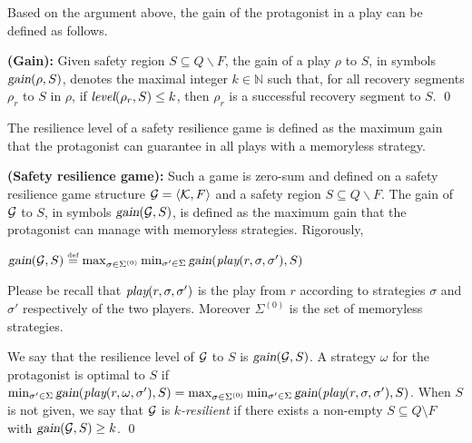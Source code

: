 Based on the argument above, 
the gain of the protagonist in a play can be defined as follows. 

\begin{definition}
\label{def.gain} {\bf (Gain):} 
Given safety region $S \subseteq Q\smallsetminus F$, 
the gain of a play $\rho$ to $S$, in symbols $\textsl{gain}(\rho,S)$, 
denotes the maximal integer $k \in \mathbb N$ such that, 
for all recovery segments $\rho_r$ to $S$ in $\rho$, 
if $\mbox{\em level}(\rho_r,S)\leq k$, 
then $\rho_r$ is a successful recovery segment to $S$. 
\qed 
\end{definition}

The resilience level of a safety resilience game is defined 
as the maximum gain that the protagonist can guarantee in all plays 
with a memoryless strategy.  


%  

\begin{definition}\label{def.srgame}  
{\bf (Safety resilience game):} 
Such a game is zero-sum and defined on 
a safety resilience game structure ${\cal G}=\langle {\cal K},F\rangle$ 
and a safety region $S\subseteq Q\smallsetminus F$. 
The gain of ${\cal G}$ to $S$, in symbols $\textsl{gain}({\cal G},S)$, is defined as 
the maximum gain that the protagonist can manage with memoryless strategies.  
Rigorously, 
\begin{center} 
$\textsl{gain}({\cal G},S)\stackrel{\mbox{\tiny def}}{=} \max_{\sigma\in \Sigma^{(0)}}\min_{\sigma'\in \Sigma}
\textsl{gain}(\mbox{\em play}(r,\sigma,\sigma'),S)$
\end{center} 
\label{reply1.emplay} 
Please be recall that $\mbox{\em play}(r,\sigma,\sigma')$ is the play from $r$ 
according to strategies $\sigma$ and $\sigma'$ respectively of the 
two players. 
Moreover $\Sigma^{(0)}$ is the set of memoryless strategies. 

We say that the resilience level of ${\cal G}$ to $S$ is $\textsl{gain}({\cal G},S)$. 
\label{reply2.optimal}
A strategy $\omega$ for the protagonist is optimal to $S$ if 
$\min_{\sigma'\in \Sigma}
\textsl{gain}(\mbox{\em play}(r,\omega,\sigma'),S)=\max_{\sigma\in \Sigma^{(0)}}\min_{\sigma'\in \Sigma}
\textsl{gain}(\mbox{\em play}(r,\sigma,\sigma'),S)$.  
When $S$ is not given, 
we say that ${\cal G}$ is {\em $k$-resilient} if there exists a non-empty $S \subseteq Q \setminus F$ with $\textsl{gain}({\cal G},S)\geq k$.
\qed 
\end{definition} 

